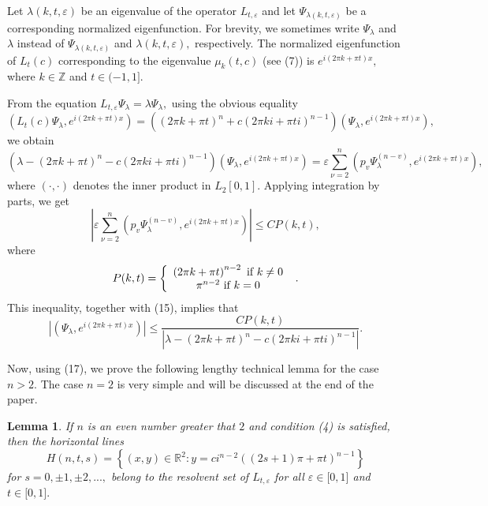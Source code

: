 \documentclass{article}%
\newtheorem{lemma}{Lemma}
{}
\begin{document}
Let $\lambda(k,t,\varepsilon)$ be an eigenvalue of the operator
$L_{t,\varepsilon}$ and let $\Psi_{\lambda(k,t,\varepsilon)}$ be a
corresponding normalized eigenfunction. For brevity, we sometimes write
$\Psi_{\lambda}$ and $\lambda$ instead of $\Psi_{\lambda(k,t,\varepsilon)}$
and $\lambda(k,t,\varepsilon),$ respectively. The normalized eigenfunction of
$L_{t}(c)$ corresponding to the eigenvalue $\mu_{k}(t,c)$ (see (7)) is
$e^{i\left(  2\pi k+\pi t\right)  x},$ where $k\in\mathbb{Z}$ and
$t\in(-1,1].$

From the equation $L_{t,\varepsilon}\Psi_{\lambda}=\lambda\Psi_{\lambda},$
using the obvious equality
\[
(L_{t}(c)\Psi_{\lambda},e^{i\left(  2\pi k+\pi t\right)  x})=((2\pi k+\pi
t)^{n}+c(2\pi ki+\pi ti)^{n-1})(\Psi_{\lambda},e^{i\left(  2\pi k+\pi
t\right)  x}),
\]
we obtain
\begin{equation}
\left(  \lambda-\left(  2\pi k+\pi t\right)  ^{n}-c(2\pi ki+\pi ti)^{n-1}%
\right)  \left(  \Psi_{\lambda},e^{i\left(  2\pi k+\pi t\right)  x}\right)
=\varepsilon\sum\limits_{\nu=2}^{n}(p_{v}\Psi_{\lambda}^{(n-v)},e^{i\left(
2\pi k+\pi t\right)  x}), \tag{15}%
\end{equation}
where $(\cdot,\cdot)$ denotes the inner product in $L_{2}\left[  0,1\right]
.$ Applying integration by parts, we get
\begin{equation}
\left\vert \varepsilon\sum\limits_{\nu=2}^{n}(p_{v}\Psi_{\lambda}%
^{(n-v)},e^{i\left(  2\pi k+\pi t\right)  x})\right\vert \leq CP(k,t),
\tag{16}%
\end{equation}
where
\[
P(k,t)=\left\{
\begin{array}
[c]{c}%
\left(  2\pi k+\pi t\right)  ^{n-2}\text{ if }k\neq0\text{ }\\
\pi^{n-2}\text{ if }k=0\text{ }%
\end{array}
\right.  .
\]
This inequality, together with (15), implies that
\begin{equation}
\left\vert \left(  \Psi_{\lambda},e^{i\left(  2\pi k+\pi t\right)  x}\right)
\right\vert \leq\frac{CP(k,t)}{\left\vert \lambda-\left(  2\pi k+\pi t\right)
^{n}-c(2\pi ki+\pi ti)^{n-1}\right\vert }. \tag{17}%
\end{equation}


Now, using (17), we prove the following lengthy technical lemma for the case
$n>2.$ The case $n=2$ is very simple and will be discussed at the end of the paper.

\begin{lemma}
If $n$ is an even number greater that $2$ and condition (4) is satisfied, then
the horizontal lines
\[
H(n,t,s)=\left\{  (x,y)\in\mathbb{R}^{2}:y=ci^{n-2}((2s+1)\pi+\pi
t)^{n-1}\right\}
\]
for $s=0,\pm1,\pm2,...,$ belong to the resolvent set of $L_{t,\varepsilon}$
for all $\varepsilon\in\lbrack0,1]$ and $t\in\lbrack0,1].$
\end{lemma}
\end{document}
